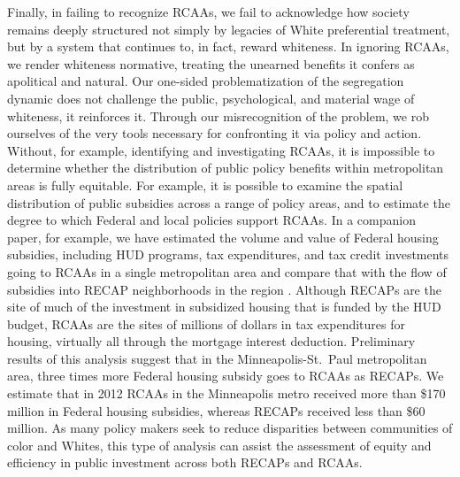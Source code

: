 \documentclass[11pt,]{article}
\begin{document}
Finally, in failing to recognize RCAAs, we fail to acknowledge how
society remains deeply structured not simply by legacies of White
preferential treatment, but by a system that continues to, in fact,
reward whiteness. In ignoring RCAAs, we render whiteness normative,
treating the unearned benefits it confers as apolitical and natural. Our
one-sided problematization of the segregation dynamic does not challenge
the public, psychological, and material wage of whiteness, it reinforces
it. Through our misrecognition of the problem, we rob ourselves of the
very tools necessary for confronting it via policy and action. Without,
for example, identifying and investigating RCAAs, it is impossible to
determine whether the distribution of public policy benefits within
metropolitan areas is fully equitable. For example, it is possible to
examine the spatial distribution of public subsidies across a range of
policy areas, and to estimate the degree to which Federal and local
policies support RCAAs. In a companion paper, for example, we have
estimated the volume and value of Federal housing subsidies, including
HUD programs, tax expenditures, and tax credit investments going to
RCAAs in a single metropolitan area and compare that with the flow of
subsidies into RECAP neighborhoods in the region
\autocite{goetzRCAA2015}. Although RECAPs are the site of much of the
investment in subsidized housing that is funded by the HUD budget, RCAAs
are the sites of millions of dollars in tax expenditures for housing,
virtually all through the mortgage interest deduction. Preliminary
results of this analysis suggest that in the Minneapolis-St.~Paul
metropolitan area, three times more Federal housing subsidy goes to
RCAAs as RECAPs. We estimate that in 2012 RCAAs in the Minneapolis metro
received more than \$170 million in Federal housing subsidies, whereas
RECAPs received less than \$60 million. As many policy makers seek to
reduce disparities between communities of color and Whites, this type of
analysis can assist the assessment of equity and efficiency in public
investment across both RECAPs and RCAAs.
\end{document}
